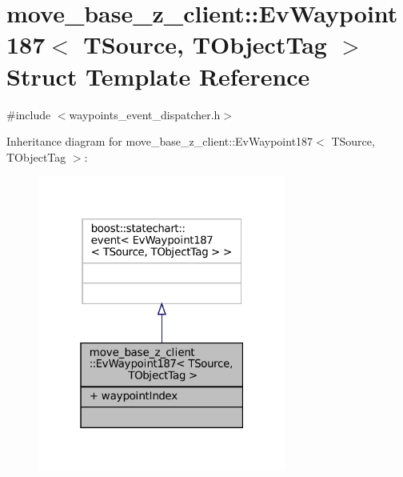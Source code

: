 \hypertarget{structmove__base__z__client_1_1EvWaypoint187}{}\section{move\+\_\+base\+\_\+z\+\_\+client\+:\+:Ev\+Waypoint187$<$ T\+Source, T\+Object\+Tag $>$ Struct Template Reference}
\label{structmove__base__z__client_1_1EvWaypoint187}


{\ttfamily \#include $<$waypoints\+\_\+event\+\_\+dispatcher.\+h$>$}



Inheritance diagram for move\+\_\+base\+\_\+z\+\_\+client\+:\+:Ev\+Waypoint187$<$ T\+Source, T\+Object\+Tag $>$\+:
\nopagebreak
\begin{figure}[H]
\begin{center}
\leavevmode
\includegraphics[width=232pt]{structmove__base__z__client_1_1EvWaypoint187__inherit__graph}
\end{center}
\end{figure}


